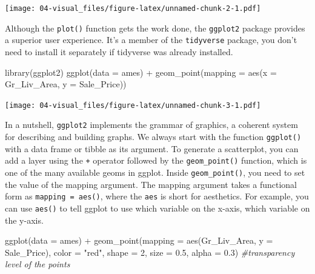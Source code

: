 \documentclass[
]{book}
\newenvironment{Shaded}{\begin{snugshade}}{\end{snugshade}}
\newcommand{\AttributeTok}[1]{\textcolor[rgb]{0.77,0.63,0.00}{#1}}
\newcommand{\CommentTok}[1]{\textcolor[rgb]{0.56,0.35,0.01}{\textit{#1}}}
\newcommand{\DecValTok}[1]{\textcolor[rgb]{0.00,0.00,0.81}{#1}}
\newcommand{\FloatTok}[1]{\textcolor[rgb]{0.00,0.00,0.81}{#1}}
\newcommand{\FunctionTok}[1]{\textcolor[rgb]{0.00,0.00,0.00}{#1}}
\newcommand{\NormalTok}[1]{#1}
\newcommand{\SpecialCharTok}[1]{\textcolor[rgb]{0.00,0.00,0.00}{#1}}
\newcommand{\StringTok}[1]{\textcolor[rgb]{0.31,0.60,0.02}{#1}}
\begin{document}
\texttt{[image: 04-visual\_files/figure-latex/unnamed-chunk-2-1.pdf]}

Although the \texttt{plot()} function gets the work done, the \texttt{ggplot2} package provides a superior user experience. It's a member of the \texttt{tidyverse} package, you don't need to install it separately if tidyverse was already installed.

\begin{Shaded}
\begin{Highlighting}[]
\FunctionTok{library}\NormalTok{(ggplot2)}
\FunctionTok{ggplot}\NormalTok{(}\AttributeTok{data =}\NormalTok{ ames) }\SpecialCharTok{+} 
  \FunctionTok{geom\_point}\NormalTok{(}\AttributeTok{mapping =} \FunctionTok{aes}\NormalTok{(}\AttributeTok{x =}\NormalTok{ Gr\_Liv\_Area, }\AttributeTok{y =}\NormalTok{ Sale\_Price))}
\end{Highlighting}
\end{Shaded}

\texttt{[image: 04-visual\_files/figure-latex/unnamed-chunk-3-1.pdf]}

In a nutshell, \texttt{ggplot2} implements the grammar of graphics, a coherent system for describing and building graphs. We always start with the function \texttt{ggplot()} with a data frame or tibble as its argument. To generate a scatterplot, you can add a layer using the \texttt{+} operator followed by the \texttt{geom\_point()} function, which is one of the many available geoms in ggplot. Inside \texttt{geom\_point()}, you need to set the value of the mapping argument. The mapping argument takes a functional form as \texttt{mapping\ =\ aes()}, where the \texttt{aes} is short for aesthetics. For example, you can use \texttt{aes()} to tell ggplot to use which variable on the x-axis, which variable on the y-axis.

\begin{Shaded}
\begin{Highlighting}[]
\FunctionTok{ggplot}\NormalTok{(}\AttributeTok{data =}\NormalTok{ ames) }\SpecialCharTok{+} 
  \FunctionTok{geom\_point}\NormalTok{(}\AttributeTok{mapping =} \FunctionTok{aes}\NormalTok{(Gr\_Liv\_Area, }\AttributeTok{y =}\NormalTok{ Sale\_Price), }
             \AttributeTok{color =} \StringTok{"red"}\NormalTok{,}
             \AttributeTok{shape =} \DecValTok{2}\NormalTok{,}
             \AttributeTok{size =} \FloatTok{0.5}\NormalTok{,}
             \AttributeTok{alpha =} \FloatTok{0.3}\NormalTok{) }\CommentTok{\#transparency level of the points}
\end{Highlighting}
\end{Shaded}
\end{document}
